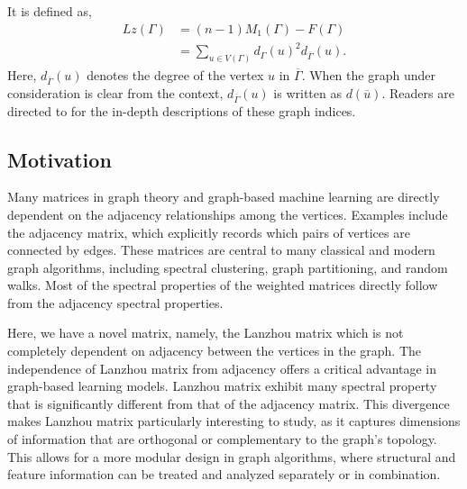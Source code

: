 \documentclass[10pt,a4paper,oneside]{article}
\begin{document}
It is defined as,
\begin{align*}
Lz(\Gamma)&=(n-1)M_1(\Gamma)-F(\Gamma)\\&=\sum\limits_{u \in V(\Gamma)}d_\Gamma(u)^2d_{\overline{\Gamma}}(u).
\end{align*}
Here, $d_{\overline{\Gamma}}(u)$ denotes the degree of the vertex $u$ in $\overline{\Gamma}.$ When the graph under consideration is clear from the context, $d_{\overline{\Gamma}}(u)$ is written as $d(\overline{u}).$ Readers are directed to \cite{2,3,4,5,6,7} for the in-depth descriptions of these graph indices.

\subsection{Motivation}
Many matrices in graph theory and graph-based machine learning are directly dependent on the adjacency relationships among the vertices. Examples include the adjacency matrix, which explicitly records which pairs of vertices are connected by edges. These matrices are central to many classical and modern graph algorithms, including spectral clustering, graph partitioning, and random walks. Most of the spectral properties of the weighted matrices directly follow from the adjacency spectral properties.

Here, we have a novel matrix, namely, the Lanzhou matrix which is not completely dependent on adjacency between the vertices in the graph. The independence of Lanzhou matrix from adjacency offers a critical advantage in graph-based learning models. Lanzhou matrix exhibit many spectral property that is significantly different from that of the adjacency matrix. This divergence makes Lanzhou matrix particularly interesting to study, as it captures dimensions of information that are orthogonal or complementary to the graph’s topology. This allows for a more modular design in graph algorithms, where structural and feature information can be treated and analyzed separately or in combination. 
\end{document}
